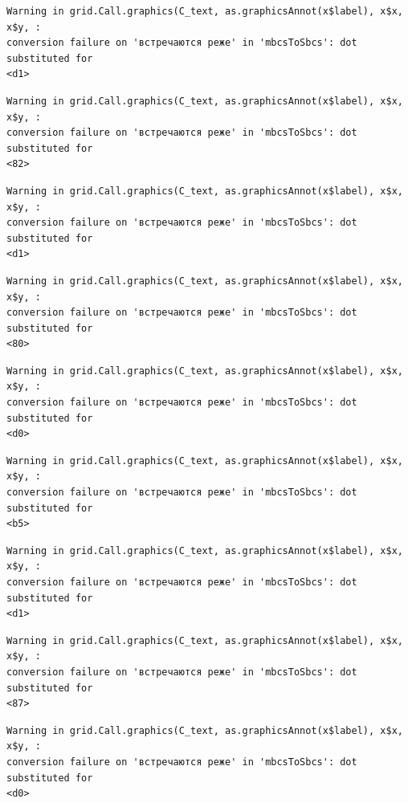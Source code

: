 \documentclass[
  letterpaper,
  DIV=11,
  numbers=noendperiod]{scrreprt}
\theoremstyle{definition}
\theoremstyle{remark}
\begin{document}
\begin{verbatim}
Warning in grid.Call.graphics(C_text, as.graphicsAnnot(x$label), x$x, x$y, :
conversion failure on 'встречаются реже' in 'mbcsToSbcs': dot substituted for
<d1>
\end{verbatim}

\begin{verbatim}
Warning in grid.Call.graphics(C_text, as.graphicsAnnot(x$label), x$x, x$y, :
conversion failure on 'встречаются реже' in 'mbcsToSbcs': dot substituted for
<82>
\end{verbatim}

\begin{verbatim}
Warning in grid.Call.graphics(C_text, as.graphicsAnnot(x$label), x$x, x$y, :
conversion failure on 'встречаются реже' in 'mbcsToSbcs': dot substituted for
<d1>
\end{verbatim}

\begin{verbatim}
Warning in grid.Call.graphics(C_text, as.graphicsAnnot(x$label), x$x, x$y, :
conversion failure on 'встречаются реже' in 'mbcsToSbcs': dot substituted for
<80>
\end{verbatim}

\begin{verbatim}
Warning in grid.Call.graphics(C_text, as.graphicsAnnot(x$label), x$x, x$y, :
conversion failure on 'встречаются реже' in 'mbcsToSbcs': dot substituted for
<d0>
\end{verbatim}

\begin{verbatim}
Warning in grid.Call.graphics(C_text, as.graphicsAnnot(x$label), x$x, x$y, :
conversion failure on 'встречаются реже' in 'mbcsToSbcs': dot substituted for
<b5>
\end{verbatim}

\begin{verbatim}
Warning in grid.Call.graphics(C_text, as.graphicsAnnot(x$label), x$x, x$y, :
conversion failure on 'встречаются реже' in 'mbcsToSbcs': dot substituted for
<d1>
\end{verbatim}

\begin{verbatim}
Warning in grid.Call.graphics(C_text, as.graphicsAnnot(x$label), x$x, x$y, :
conversion failure on 'встречаются реже' in 'mbcsToSbcs': dot substituted for
<87>
\end{verbatim}

\begin{verbatim}
Warning in grid.Call.graphics(C_text, as.graphicsAnnot(x$label), x$x, x$y, :
conversion failure on 'встречаются реже' in 'mbcsToSbcs': dot substituted for
<d0>
\end{verbatim}
\end{document}

